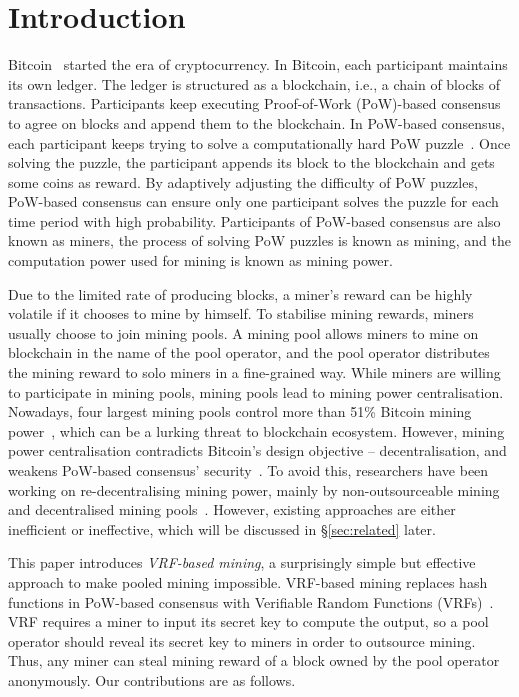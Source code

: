 \section{Introduction}
\label{sec:intro}

Bitcoin~\cite{nakamoto2008bitcoin} started the era of cryptocurrency.
In Bitcoin, each participant maintains its own ledger.
The ledger is structured as a blockchain, i.e., a chain of blocks of transactions.
Participants keep executing Proof-of-Work (PoW)-based consensus to agree on blocks and append them to the blockchain.
In PoW-based consensus, each participant keeps trying to solve a computationally hard PoW puzzle~\cite{dwork1992pricing}.
Once solving the puzzle, the participant appends its block to the blockchain and gets some coins as reward.
By adaptively adjusting the difficulty of PoW puzzles, PoW-based consensus can ensure only one participant solves the puzzle for each time period with high probability.
Participants of PoW-based consensus are also known as miners, the process of solving PoW puzzles is known as mining, and the computation power used for mining is known as mining power.

Due to the limited rate of producing blocks, a miner's reward can be highly volatile if it chooses to mine by himself.
To stabilise mining rewards, miners usually choose to join mining pools.
A mining pool allows miners to mine on blockchain in the name of the pool operator, and the pool operator distributes the mining reward to solo miners in a fine-grained way.
While miners are willing to participate in mining pools, mining pools lead to mining power centralisation.
Nowadays, four largest mining pools control more than 51\% Bitcoin mining power~\cite{btc-com}, which can be a lurking threat to blockchain ecosystem.
However, mining power centralisation contradicts Bitcoin's design objective -- decentralisation, and weakens PoW-based consensus' security~\cite{nakamoto2008bitcoin, eyal2018majority}.
To avoid this, researchers have been working on re-decentralising mining power, mainly by non-outsourceable mining~\cite{miller2015nonoutsourceable,2P-PoW} and decentralised mining pools~\cite{voight2011p2pool, luu2017smartpool, draft-bip-BetterHash}.
However, existing approaches are either inefficient or ineffective, which will be discussed in \S\ref{sec:related} later.

This paper introduces \textit{VRF-based mining}, a surprisingly simple but effective approach to make pooled mining impossible.
VRF-based mining replaces hash functions in PoW-based consensus with Verifiable Random Functions (VRFs)~\cite{micali1999verifiable}.
VRF requires a miner to input its secret key to compute the output, so a pool operator should reveal its secret key to miners in order to outsource mining.
Thus, any miner can steal mining reward of a block owned by the pool operator anonymously.
Our contributions are as follows.

